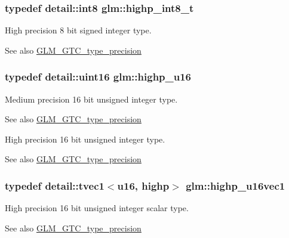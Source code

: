 \subsubsection[{\texorpdfstring{highp\+\_\+int8\+\_\+t}{highp_int8_t}}]{\setlength{\rightskip}{0pt plus 5cm}typedef detail\+::int8 {\bf glm\+::highp\+\_\+int8\+\_\+t}}\hypertarget{group__gtc__type__precision_ga417701b99e6e7992f35ab2ef694f88b2}{}\label{group__gtc__type__precision_ga417701b99e6e7992f35ab2ef694f88b2}
High precision 8 bit signed integer type. \begin{DoxySeeAlso}{See also}
\hyperlink{group__gtc__type__precision}{G\+L\+M\+\_\+\+G\+T\+C\+\_\+type\+\_\+precision} 
\end{DoxySeeAlso}
\subsubsection[{\texorpdfstring{highp\+\_\+u16}{highp_u16}}]{\setlength{\rightskip}{0pt plus 5cm}typedef detail\+::uint16 {\bf glm\+::highp\+\_\+u16}}\hypertarget{group__gtc__type__precision_ga9da2178d7501d9c0f225fa1a7b70cb45}{}\label{group__gtc__type__precision_ga9da2178d7501d9c0f225fa1a7b70cb45}
Medium precision 16 bit unsigned integer type. \begin{DoxySeeAlso}{See also}
\hyperlink{group__gtc__type__precision}{G\+L\+M\+\_\+\+G\+T\+C\+\_\+type\+\_\+precision}
\end{DoxySeeAlso}
High precision 16 bit unsigned integer type. \begin{DoxySeeAlso}{See also}
\hyperlink{group__gtc__type__precision}{G\+L\+M\+\_\+\+G\+T\+C\+\_\+type\+\_\+precision} 
\end{DoxySeeAlso}
\subsubsection[{\texorpdfstring{highp\+\_\+u16vec1}{highp_u16vec1}}]{\setlength{\rightskip}{0pt plus 5cm}typedef detail\+::tvec1$<$u16, highp$>$ {\bf glm\+::highp\+\_\+u16vec1}}\hypertarget{group__gtc__type__precision_gac4a83dec879b77ab0055c8da232da066}{}\label{group__gtc__type__precision_gac4a83dec879b77ab0055c8da232da066}
High precision 16 bit unsigned integer scalar type. \begin{DoxySeeAlso}{See also}
\hyperlink{group__gtc__type__precision}{G\+L\+M\+\_\+\+G\+T\+C\+\_\+type\+\_\+precision} 
\end{DoxySeeAlso}
